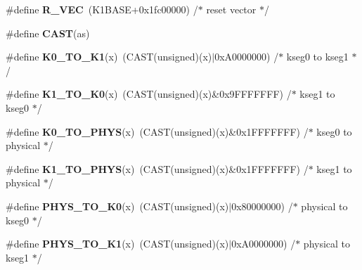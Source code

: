 \begin{DoxyCompactItemize}
\item 
\mbox{\label{group__RTEMSScoreMIPSSet__idtcpu_ga1dc3e3c31c6b117b22818c5dc1391e73}} 
\#define {\bfseries R\+\_\+\+V\+EC}~(K1\+B\+A\+SE+0x1fc00000)	/$\ast$ reset vector $\ast$/
\item 
\mbox{\label{group__RTEMSScoreMIPSSet__idtcpu_ga0bf0f96487d5d434064092eedaf5fefa}} 
\#define {\bfseries C\+A\+ST}(as)
\item 
\mbox{\label{group__RTEMSScoreMIPSSet__idtcpu_ga5ae3334c23012184175345172a0cac1e}} 
\#define {\bfseries K0\+\_\+\+T\+O\+\_\+\+K1}(x)~(C\+A\+ST(unsigned)(x)$\vert$0x\+A0000000)	/$\ast$ kseg0 to kseg1 $\ast$/
\item 
\mbox{\label{group__RTEMSScoreMIPSSet__idtcpu_gac3f97b9e95436eb2cd9bf16c8633a230}} 
\#define {\bfseries K1\+\_\+\+T\+O\+\_\+\+K0}(x)~(C\+A\+ST(unsigned)(x)\&0x9\+F\+F\+F\+F\+F\+F\+F)	/$\ast$ kseg1 to kseg0 $\ast$/
\item 
\mbox{\label{group__RTEMSScoreMIPSSet__idtcpu_ga316c03632d14d84593e9908e473f565e}} 
\#define {\bfseries K0\+\_\+\+T\+O\+\_\+\+P\+H\+YS}(x)~(C\+A\+ST(unsigned)(x)\&0x1\+F\+F\+F\+F\+F\+F\+F)	/$\ast$ kseg0 to physical $\ast$/
\item 
\mbox{\label{group__RTEMSScoreMIPSSet__idtcpu_gabbba41e07fa4ca0fed97fdeb7185d6ec}} 
\#define {\bfseries K1\+\_\+\+T\+O\+\_\+\+P\+H\+YS}(x)~(C\+A\+ST(unsigned)(x)\&0x1\+F\+F\+F\+F\+F\+F\+F)	/$\ast$ kseg1 to physical $\ast$/
\item 
\mbox{\label{group__RTEMSScoreMIPSSet__idtcpu_ga60b733c1eb80b686609ce3d9024d7770}} 
\#define {\bfseries P\+H\+Y\+S\+\_\+\+T\+O\+\_\+\+K0}(x)~(C\+A\+ST(unsigned)(x)$\vert$0x80000000)	/$\ast$ physical to kseg0 $\ast$/
\item 
\mbox{\label{group__RTEMSScoreMIPSSet__idtcpu_ga3a3f158c25a6f29485d6d493fee38229}} 
\#define {\bfseries P\+H\+Y\+S\+\_\+\+T\+O\+\_\+\+K1}(x)~(C\+A\+ST(unsigned)(x)$\vert$0x\+A0000000)	/$\ast$ physical to kseg1 $\ast$/

\end{DoxyCompactItemize}
